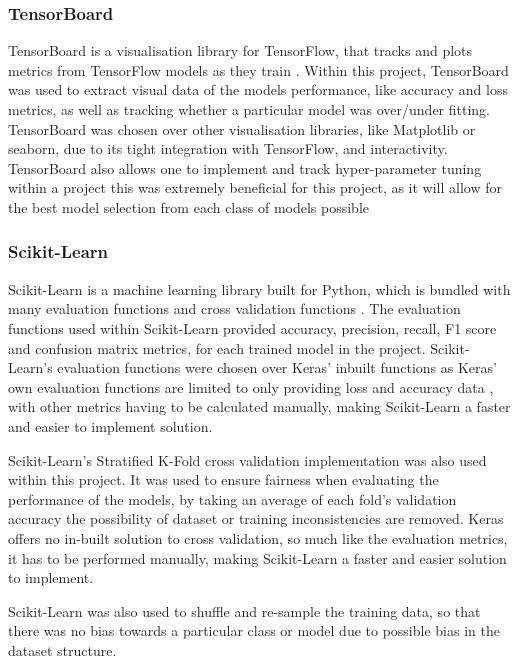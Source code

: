 \subsubsection{TensorBoard}
TensorBoard is a visualisation library for TensorFlow, that tracks and plots metrics from TensorFlow models as they train \citep{TensorBo28:online}. Within this project, TensorBoard was used to extract visual data of the models performance, like accuracy and loss metrics, as well as tracking whether a particular model was over/under fitting. TensorBoard was chosen over other visualisation libraries, like Matplotlib or seaborn, due to its tight integration with TensorFlow, and interactivity. TensorBoard also allows one to implement and track hyper-parameter tuning within a project this was extremely beneficial for this project, as it will allow for the best model selection from each class of models possible

\subsubsection{Scikit-Learn}
Scikit-Learn is a machine learning library built for Python, which is bundled with many evaluation functions \citep{33Metric9:online} and cross validation functions \citep{31Crossv34:online}. The evaluation functions used within Scikit-Learn provided accuracy, precision, recall, F1 score and confusion matrix metrics, for each trained model in the project. Scikit-Learn's evaluation functions were chosen over Keras' inbuilt functions as Keras' own evaluation functions are limited to only providing loss and accuracy data \citep{Modeltra48:online}, with other metrics having to be calculated manually, making Scikit-Learn a faster and easier to implement solution. 

Scikit-Learn's Stratified K-Fold \citep{sklearnm1:online} cross validation implementation was also used within this project. It was used to ensure fairness when evaluating the performance of the models, by taking an average of each fold's validation accuracy the possibility of dataset or training inconsistencies are removed. Keras offers no in-built solution to cross validation, so much like the evaluation metrics, it has to be performed manually, making Scikit-Learn a faster and easier solution to implement.

Scikit-Learn was also used to shuffle and re-sample the training data, so that there was no bias towards a particular class or model due to possible bias in the dataset structure.

